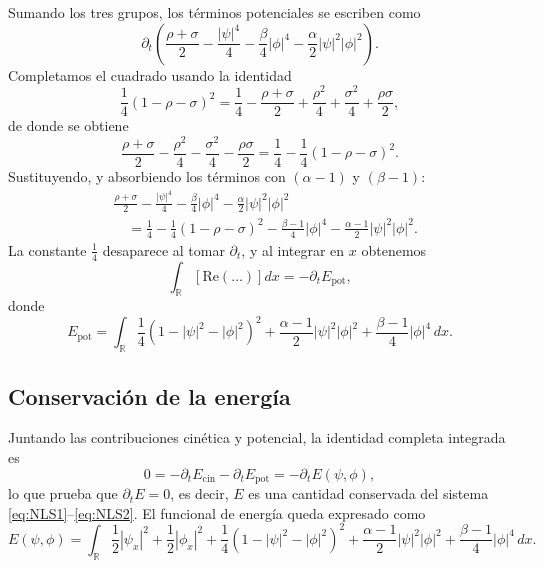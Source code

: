 \documentclass[letterpaper,11pt]{exam}
\theoremstyle{plain}
\begin{document}
Sumando los tres grupos, los términos potenciales se escriben como
\begin{equation}
    \partial_t\!\left(\frac{\rho+\sigma}{2} - \frac{|\psi|^4}{4}
    - \frac{\beta}{4}|\phi|^4 - \frac{\alpha}{2}|\psi|^2|\phi|^2\right).
\end{equation}
Completamos el cuadrado usando la identidad
\begin{equation}
    \frac{1}{4}(1-\rho-\sigma)^2
    = \frac{1}{4} - \frac{\rho+\sigma}{2} + \frac{\rho^2}{4} + \frac{\sigma^2}{4}
    + \frac{\rho\sigma}{2},
\end{equation}
de donde se obtiene
\begin{equation}
    \frac{\rho+\sigma}{2} - \frac{\rho^2}{4} - \frac{\sigma^2}{4} - \frac{\rho\sigma}{2}
    = \frac{1}{4} - \frac{1}{4}(1-\rho-\sigma)^2.
\end{equation}
Sustituyendo, y absorbiendo los términos con $(\alpha-1)$ y $(\beta-1)$:
\begin{align}
    &\frac{\rho+\sigma}{2} - \frac{|\psi|^4}{4} - \frac{\beta}{4}|\phi|^4
    - \frac{\alpha}{2}|\psi|^2|\phi|^2 \nonumber\\
    &\quad= \frac{1}{4} - \frac{1}{4}(1-\rho-\sigma)^2
    - \frac{\beta-1}{4}|\phi|^4 - \frac{\alpha-1}{2}|\psi|^2|\phi|^2.
\end{align}
La constante $\frac{1}{4}$ desaparece al tomar $\partial_t$, y al integrar en $x$ obtenemos
\begin{equation}
    \int_{\mathbb{R}}\!\left[\mathrm{Re}(\ldots)\right]dx = -\partial_t E_{\mathrm{pot}},
\end{equation}
donde
\begin{equation}
    E_{\mathrm{pot}} = \int_{\mathbb{R}} \frac{1}{4}(1-|\psi|^2-|\phi|^2)^2
    + \frac{\alpha-1}{2}|\psi|^2|\phi|^2 + \frac{\beta-1}{4}|\phi|^4\,dx.
\end{equation}

\subsection*{Conservación de la energía}

Juntando las contribuciones cinética y potencial, la identidad completa integrada es
\begin{equation}
    0 = -\partial_t E_{\mathrm{cin}} - \partial_t E_{\mathrm{pot}} = -\partial_t E(\psi,\phi),
\end{equation}
lo que prueba que $\partial_t E = 0$, es decir, $E$ es una cantidad conservada del sistema
\eqref{eq:NLS1}--\eqref{eq:NLS2}. El funcional de energía queda expresado como
\begin{equation}
    E(\psi,\phi) = \int_{\mathbb{R}} \frac{1}{2}|\psi_x|^2 + \frac{1}{2}|\phi_x|^2
    + \frac{1}{4}(1 - |\psi|^2 - |\phi|^2)^2
    + \frac{\alpha-1}{2}|\psi|^2|\phi|^2
    + \frac{\beta-1}{4}|\phi|^4 \, dx.
\end{equation}
\end{document}
